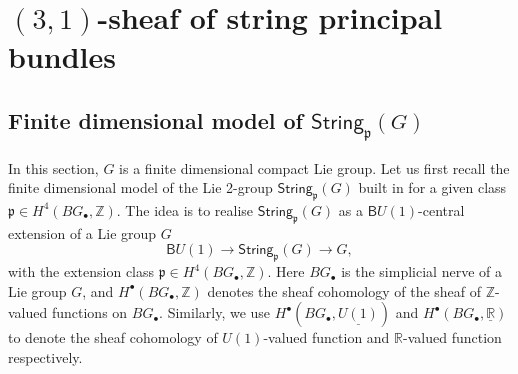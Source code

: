 \documentclass[letterpaper,10pt, oneside]{article} %
\newcommand {\emptycomment}[1]{}
\newcommand{\Cat}{\mathcal M}%
\newcommand{\Sets}{\mathsf{Sets}}%
\newcommand{\Gpd}{\mathsf{Gpd}}%
\newcommand{\tGpd}{\mathsf{2Gpd}}%
\newcommand{\String}{\mathsf{String}}%
\newcommand{\B}{\mathsf{B}}%
\newcommand{\R}{\mathbb R}\newcommand{\Z}{\mathbb Z}
\newcommand{\frkp}{\mathfrak p}
\newcommand{\pp}{\frkp} %
\begin{document}
\emptycomment{
Then equivalence between two such functors $X$ and $Y$ is a stalk-wise
weak equivalence. Let's suppose $X: \Cat \to \tGpd$ has level $X_0,
X_1, B^X_2$, where $\Theta(X):=B^X_2\Rightarrow X_1$ is a groupoid. Notice that
$X_i$ becomes then a presheaf values in $\Sets$ on $\Cat$. Then a
stalk-wise weak equivalence $X\xrightarrow{f} Y$ is  to make
\[
\begin{split}
X_0 \times_{Y_0} Y_1 \to Y_0, \quad \text{stalkwise surjective} \\
X_1\times_{Y_1} B^Y_2 \to X_0\times X_0 \times_{Y_0\times Y_0} Y_1, \quad \text{stalkwise surjective} \\
B_2^X \cong B_2^Y\times_{Y_1\times Y_1} X_1 \times X_1
\times_{Y_0\times Y_0} X_0 \times X_0
\end{split}
\]
The last is an isomorphism, and we know that stalkwise isomorphism is
equivalent to objectwise isomorphism (that is the two sheaves are
isomorphic). We notice that objectwise surjectivity implies stalkwise
surjectivity. If $X$ and $Y$ are just $(2,1)$-sheaves, that is, they
take value in $\Gpd$ instead of $\tGpd$, we then have corresponding
condition:
\[
\begin{split}
X_0 \times_{Y_0} Y_1 \to Y_0, \quad \text{stalkwise surjective} \\
X_1\cong Y_1\times_{Y_0\times Y_0}X_0\times X_0.
\end{split}
\]
We notice that it is the usual stack isomorphism: the first condition
is to ask the morphism to be essentially surjective, the second fully
faithful. Thus the last two conditions in the 2-stack case is in fact
to ask $\Theta(X) \to \Theta(Y)|_{X_0}$ to be a weak equivalence for 1-groupoids.
(see also later in the example of principal bundles)
}
\section{$(3,1)$-sheaf of string principal bundles}

\subsection{Finite dimensional model of $\String_\pp(G)$}\label{sec:string-gp}

In this section, $G$ is a finite dimensional compact  Lie
group. Let us first recall the finite dimensional model of the Lie 2-group
$\String_{\pp}(G)$ built in \cite{schommer-pries:string} for a given class $\pp \in H^4(BG_\bullet, \Z)$. The idea is to realise $\String_\pp(G)$ as a $\B U(1)$-central extension of a Lie group
$G$
$$
\B U(1)\longrightarrow \String_\pp(G)\longrightarrow G,
$$
with the extension class  $\pp \in H^4(BG_\bullet, \Z)$. Here $BG_\bullet$ is the simplicial nerve of a Lie
group $G$, and  $H^\bullet(BG_\bullet, \Z)$  denotes the sheaf cohomology of
the sheaf of $\Z$-valued functions on $BG_\bullet$. Similarly, we use $H^\bullet(BG_\bullet,
\underline{U(1)})$ and $H^\bullet(BG_\bullet, \underline{\R})$ to denote the
sheaf cohomology of $U(1)$-valued function and $\R$-valued function
respectively.
\end{document}
